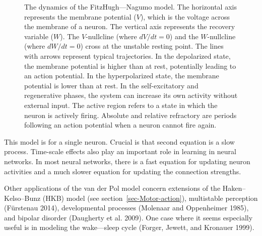 \documentclass[
  a4paper,
  DIV=11,
  numbers=noendperiod,
  oneside]{scrreprt}
\begin{document}
\begin{figure}


\caption{\label{fig-ch4n-img15-old-63}The dynamics of the
FitzHugh---Nagumo model. The horizontal axis represents the membrane
potential (\(V\)), which is the voltage across the membrane of a neuron.
The vertical axis represents the recovery variable (\(W\)). The
\(V\)-nullcline (where \(dV/dt = 0\)) and the \(W\)-nullcline (where
\(dW/dt = 0\)) cross at the unstable resting point. The lines with
arrows represent typical trajectories. In the depolarized state, the
membrane potential is higher than at rest, potentially leading to an
action potential. In the hyperpolarized state, the membrane potential is
lower than at rest. In the self-excitatory and regenerative phases, the
system can increase its own activity without external input. The active
region refers to a state in which the neuron is actively firing.
Absolute and relative refractory are periods following an action
potential when a neuron cannot fire again.}

\end{figure}%

This model is for a single neuron. Crucial is that second equation is a
slow process. Time-scale effects also play an important role in learning
in neural networks. In most neural networks, there is a fast equation
for updating neuron activities and a much slower equation for updating
the connection strengths.

Other applications of the van der Pol model concern extensions of the
Haken--Kelso--Bunz (HKB) model (see section~\ref{sec-Motor-action}),
multistable perception (Fürstenau 2014), developmental processes
(Molenaar and Oppenheimer 1985), and bipolar disorder (Daugherty et al.
2009). One case where it seems especially useful is in modeling the
wake---sleep cycle (Forger, Jewett, and Kronauer 1999).
\end{document}
